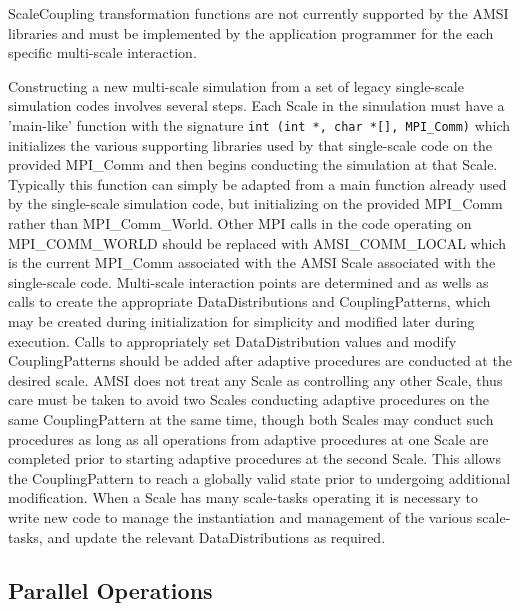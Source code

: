 \documentclass[11pt]{article}
\begin{document}
ScaleCoupling transformation functions are not currently supported by the AMSI libraries and must be implemented by the application programmer for the each specific multi-scale interaction.

Constructing a new multi-scale simulation from a set of legacy single-scale simulation codes involves several steps.
Each Scale in the simulation must have a 'main-like' function with the signature \verb|int (int *, char *[], MPI_Comm)| which initializes the various supporting libraries used by that single-scale code on the provided MPI\_Comm and then begins conducting the simulation at that Scale. 
Typically this function can simply be adapted from a main function already used by the single-scale simulation code, but initializing on the provided MPI\_Comm rather than MPI\_Comm\_World. 
Other MPI calls in the code operating on MPI\_COMM\_WORLD should be replaced with AMSI\_COMM\_LOCAL which is the current MPI\_Comm associated with the AMSI Scale associated with the single-scale code. 
Multi-scale interaction points are determined and as wells as calls to create the appropriate DataDistributions and CouplingPatterns, which may be created during initialization for simplicity and modified later during execution.
Calls to appropriately set DataDistribution values and modify CouplingPatterns should be added after adaptive procedures are conducted at the desired scale.
AMSI does not treat any Scale as controlling any other Scale, thus care must be taken to avoid two Scales conducting adaptive procedures on the same CouplingPattern at the same time, though both Scales may conduct such procedures as long as all operations from adaptive procedures at one Scale are completed prior to starting adaptive procedures at the second Scale. 
This allows the CouplingPattern to reach a globally valid state prior to undergoing additional modification. 
When a Scale has many scale-tasks operating it is necessary to write new code to manage the instantiation and management of the various scale-tasks, and update the relevant DataDistributions as required.

\subsection{Parallel Operations}\label{paralle_ops}
\end{document}
